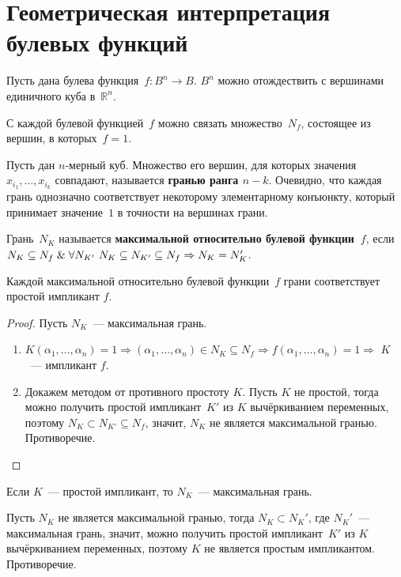 \section{Геометрическая интерпретация булевых функций}
Пусть дана булева функция~$f \colon B^n \to B$.
$B^n$ можно отождествить с вершинами единичного куба в~$\mathbb R^n$.

С каждой булевой функцией~$f$ можно связать множество~$N_f$, состоящее из вершин, в которых~$f = 1$.

Пусть дан $n$-мерный куб.
 Множество его вершин, для которых значения~$x_{i_1}, \ldots, x_{i_k}$ совпадают, называется \textbf{гранью ранга $n - k$}.
Очевидно, что каждая грань однозначно соответствует некоторому элементарному конъюнкту, который принимает значение~$1$ в точности на вершинах грани.

Грань~$N_K$ называется \textbf{максимальной относительно булевой функции~$f$}, если $N_K \subseteq N_f \opbr\lAnd \forall N_{K'} \ N_K \subseteq N_{K'} \subseteq N_f \Rightarrow N_K = N_K'$.

\begin{statement}
Каждой максимальной относительно булевой функции~$f$ грани соответствует простой импликант $f$.
\end{statement}
\begin{proof}
Пусть $N_K$~--- максимальная грань.
\begin{enumerate}
	\item $K(\alpha_1, \ldots, \alpha_n) = 1 \Rightarrow
	(\alpha_1, \ldots, \alpha_n) \in N_K \subseteq N_f \Rightarrow
	f(\alpha_1, \ldots, \alpha_n) = 1 \Rightarrow$
	$K$~--- импликант $f$.
	
	\item Докажем методом от противного простоту $K$.
	Пусть $K$ не простой, тогда можно получить простой импликант~$K'$ из $K$ вычёркиванием переменных, поэтому $N_K \subset N_{K'} \subseteq N_f$, значит, $N_K$ не является максимальной гранью.
	Противоречие.
\end{enumerate}
\end{proof}

\begin{statement}
Если $K$~--- простой импликант, то $N_K$~--- максимальная грань.
\end{statement}
\begin{proofcontra}
Пусть $N_K$ не является максимальной гранью, тогда $N_K \subset N_K'$, где $N_K'$~--- максимальная грань, значит, можно получить простой импликант~$K'$ из $K$ вычёркиванием переменных, поэтому $K$ не является простым импликантом.
Противоречие.
\end{proofcontra}

